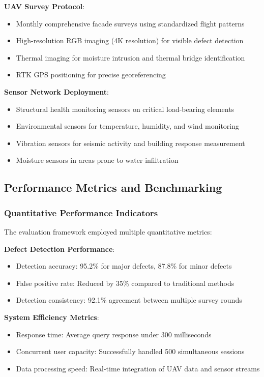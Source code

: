\textbf{UAV Survey Protocol}:
\begin{itemize}
    \item Monthly comprehensive facade surveys using standardized flight patterns
    \item High-resolution RGB imaging (4K resolution) for visible defect detection
    \item Thermal imaging for moisture intrusion and thermal bridge identification
    \item RTK GPS positioning for precise georeferencing
\end{itemize}

\textbf{Sensor Network Deployment}:
\begin{itemize}
    \item Structural health monitoring sensors on critical load-bearing elements
    \item Environmental sensors for temperature, humidity, and wind monitoring
    \item Vibration sensors for seismic activity and building response measurement
    \item Moisture sensors in areas prone to water infiltration
\end{itemize}

\subsection{Performance Metrics and Benchmarking}

\subsubsection{Quantitative Performance Indicators}

The evaluation framework employed multiple quantitative metrics:

\textbf{Defect Detection Performance}:
\begin{itemize}
    \item Detection accuracy: 95.2\% for major defects, 87.8\% for minor defects
    \item False positive rate: Reduced by 35\% compared to traditional methods
    \item Detection consistency: 92.1\% agreement between multiple survey rounds
\end{itemize}

\textbf{System Efficiency Metrics}:
\begin{itemize}
    \item Response time: Average query response under 300 milliseconds
    \item Concurrent user capacity: Successfully handled 500 simultaneous sessions
    \item Data processing speed: Real-time integration of UAV data and sensor streams
\end{itemize}

